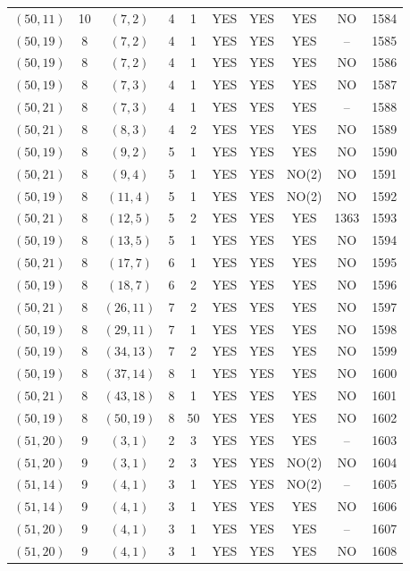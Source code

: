 \begin{longtable}{|c|c|c|c|c|c|c|c|c|c|}
$(50, 11)$ & 10 & $(7, 2)$ & 4 & 1 & YES & YES & YES & NO & 1584\\
$(50, 19)$ & 8 & $(7, 2)$ & 4 & 1 & YES & YES & YES & -- & 1585\\
$(50, 19)$ & 8 & $(7, 2)$ & 4 & 1 & YES & YES & YES & NO & 1586\\
$(50, 19)$ & 8 & $(7, 3)$ & 4 & 1 & YES & YES & YES & NO & 1587\\
$(50, 21)$ & 8 & $(7, 3)$ & 4 & 1 & YES & YES & YES & -- & 1588\\
$(50, 21)$ & 8 & $(8, 3)$ & 4 & 2 & YES & YES & YES & NO & 1589\\
$(50, 19)$ & 8 & $(9, 2)$ & 5 & 1 & YES & YES & YES & NO & 1590\\
$(50, 21)$ & 8 & $(9, 4)$ & 5 & 1 & YES & YES & NO(2) & NO & 1591\\
$(50, 19)$ & 8 & $(11, 4)$ & 5 & 1 & YES & YES & NO(2) & NO & 1592\\
$(50, 21)$ & 8 & $(12, 5)$ & 5 & 2 & YES & YES & YES & 1363 & 1593\\
$(50, 19)$ & 8 & $(13, 5)$ & 5 & 1 & YES & YES & YES & NO & 1594\\
$(50, 21)$ & 8 & $(17, 7)$ & 6 & 1 & YES & YES & YES & NO & 1595\\
$(50, 19)$ & 8 & $(18, 7)$ & 6 & 2 & YES & YES & YES & NO & 1596\\
$(50, 21)$ & 8 & $(26, 11)$ & 7 & 2 & YES & YES & YES & NO & 1597\\
$(50, 19)$ & 8 & $(29, 11)$ & 7 & 1 & YES & YES & YES & NO & 1598\\
$(50, 19)$ & 8 & $(34, 13)$ & 7 & 2 & YES & YES & YES & NO & 1599\\
$(50, 19)$ & 8 & $(37, 14)$ & 8 & 1 & YES & YES & YES & NO & 1600\\
$(50, 21)$ & 8 & $(43, 18)$ & 8 & 1 & YES & YES & YES & NO & 1601\\
$(50, 19)$ & 8 & $(50, 19)$ & 8 & 50 & YES & YES & YES & NO & 1602\\
$(51, 20)$ & 9 & $(3, 1)$ & 2 & 3 & YES & YES & YES & -- & 1603\\
$(51, 20)$ & 9 & $(3, 1)$ & 2 & 3 & YES & YES & NO(2) & NO & 1604\\
$(51, 14)$ & 9 & $(4, 1)$ & 3 & 1 & YES & YES & NO(2) & -- & 1605\\
$(51, 14)$ & 9 & $(4, 1)$ & 3 & 1 & YES & YES & YES & NO & 1606\\
$(51, 20)$ & 9 & $(4, 1)$ & 3 & 1 & YES & YES & YES & -- & 1607\\
$(51, 20)$ & 9 & $(4, 1)$ & 3 & 1 & YES & YES & YES & NO & 1608\\

\end{longtable}
